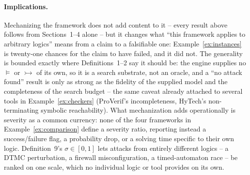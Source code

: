 \documentclass[11pt]{amsart}
\theoremstyle{definition}
\theoremstyle{remark}
\newcommand{\adv}{\rightarrowtail}   %
\begin{document}
\paragraph{Implications.} Mechanizing the framework does not add content to it -- every result above
follows from Sections~1--4 alone -- but it changes what ``this framework applies to arbitrary
logics'' means from a claim to a falsifiable one: Example~\ref{ex:instances} is twenty-one chances
for the claim to have failed, and it did not. The generality is bounded exactly where
Definitions~1--2 say it should be: the engine supplies no $\models$ or $\adv$ of its own, so it is a
search substrate, not an oracle, and a ``no attack found'' result is only as strong as the fidelity
of the supplied model and the completeness of the search budget -- the same caveat already attached
to several tools in Example~\ref{ex:checkers} (ProVerif's incompleteness, HyTech's non-terminating
symbolic reachability). What mechanization adds operationally is severity as a common currency:
none of the four frameworks in Example~\ref{ex:comparison} define a severity ratio, reporting
instead a success/failure flag, a probability drop, or a solving time specific to their own logic.
Definition~9's $\sigma \in [0,1]$ lets attacks from entirely different logics -- a DTMC perturbation,
a firewall misconfiguration, a timed-automaton race -- be ranked on one scale, which no individual
logic or tool provides on its own.
\end{document}
